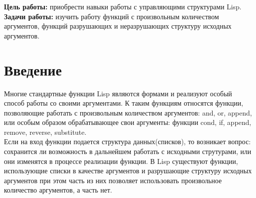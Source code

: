 \documentclass[a4paper, 12pt]{article}
\begin{document}
\tableofcontents
\clearpage
\newpage

\textbf{Цель работы:} приобрести навыки работы с управляющими структурами Lisp.
\\ \hspace*{5mm} \textbf{Задачи работы:} изучить работу функций с произвольным количеством аргументов, функций разрушающих и неразрушающих структуру исходных аргументов.


\section*{Введение}

\hspace*{5mm} Многие стандартные функции Lisp являются формами и реализуют особый способ работы со своими аргументами. К таким функциям относятся функции, позволяющие работать с произвольным количеством аргументов: and, or, append, или особым образом обрабатывающее свои аргументы: функции cond, if, append, remove, reverse, substitute.
\\ \hspace*{5mm} Если на вход функции подается структура данных(списков), то возникает вопрос: сохранится ли возможность в дальнейшем работать с исходными струтурами, или они изменятся в процессе реализации функции. В Lisp существуют функции, использующие списки в качестве аргументов и разрушающие структуру исходных аргументов при этом часть из них позволяет использовать произвольное количество аргументов, а часть нет.
\clearpage
\newpage




\lstset{style=mystyle}
\end{document}
